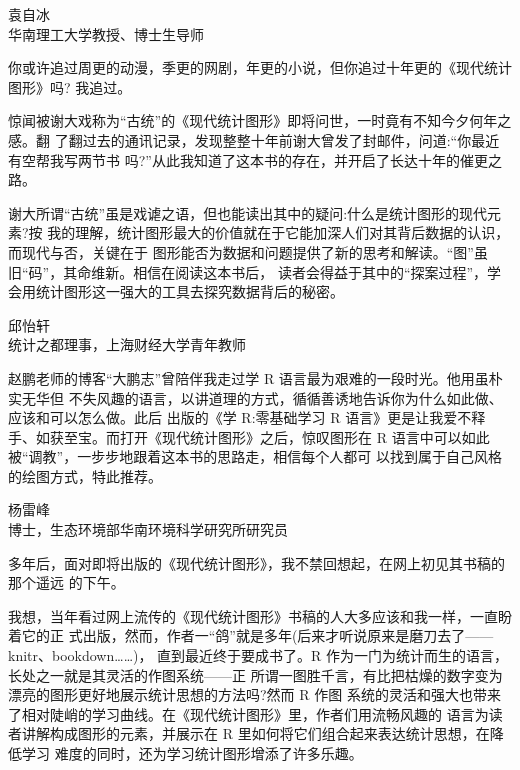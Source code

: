\documentclass[
  b5paper,
  UTF8,twoside]{book}
\begin{document}
\begin{flushright}
袁自冰\\
华南理工大学教授、博士生导师
\end{flushright}

你或许追过周更的动漫，季更的网剧，年更的小说，但你追过十年更的《现代统计图形》吗?
我追过。

惊闻被谢大戏称为``古统''的《现代统计图形》即将问世，一时竟有不知今夕何年之感。翻 了翻过去的通讯记录，发现整整十年前谢大曾发了封邮件，问道:``你最近有空帮我写两节书 吗?''从此我知道了这本书的存在，并开启了长达十年的催更之路。

谢大所谓``古统''虽是戏谑之语，但也能读出其中的疑问:什么是统计图形的现代元素?按 我的理解，统计图形最大的价值就在于它能加深人们对其背后数据的认识，而现代与否，关键在于 图形能否为数据和问题提供了新的思考和解读。``图''虽旧``码''，其命维新。相信在阅读这本书后， 读者会得益于其中的``探案过程''，学会用统计图形这一强大的工具去探究数据背后的秘密。

\begin{flushright}
邱怡轩\\
统计之都理事，上海财经大学青年教师
\end{flushright}

赵鹏老师的博客``大鹏志''曾陪伴我走过学 R 语言最为艰难的一段时光。他用虽朴实无华但 不失风趣的语言，以讲道理的方式，循循善诱地告诉你为什么如此做、应该和可以怎么做。此后 出版的《学 R:零基础学习 R 语言》更是让我爱不释手、如获至宝。而打开《现代统计图形》之后，惊叹图形在 R 语言中可以如此被``调教''，一步步地跟着这本书的思路走，相信每个人都可
以找到属于自己风格的绘图方式，特此推荐。

\begin{flushright}
杨雷峰\\
博士，生态环境部华南环境科学研究所研究员
\end{flushright}

多年后，面对即将出版的《现代统计图形》，我不禁回想起，在网上初见其书稿的那个遥远 的下午。

我想，当年看过网上流传的《现代统计图形》书稿的人大多应该和我一样，一直盼着它的正 式出版，然而，作者一``鸽''就是多年(后来才听说原来是磨刀去了------knitr、bookdown\ldots\ldots)， 直到最近终于要成书了。R 作为一门为统计而生的语言，长处之一就是其灵活的作图系统------正 所谓一图胜千言，有比把枯燥的数字变为漂亮的图形更好地展示统计思想的方法吗?然而 R 作图 系统的灵活和强大也带来了相对陡峭的学习曲线。在《现代统计图形》里，作者们用流畅风趣的 语言为读者讲解构成图形的元素，并展示在 R 里如何将它们组合起来表达统计思想，在降低学习 难度的同时，还为学习统计图形增添了许多乐趣。
\end{document}
